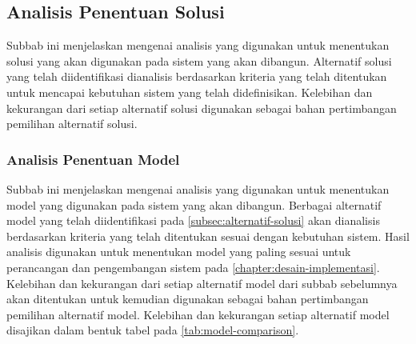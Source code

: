\subsection{Analisis Penentuan Solusi}
\label{subsec:analisis-penentuan-solusi}
Subbab ini menjelaskan mengenai analisis yang digunakan untuk menentukan solusi yang akan digunakan pada sistem yang akan dibangun. Alternatif solusi yang telah diidentifikasi dianalisis berdasarkan kriteria yang telah ditentukan untuk mencapai kebutuhan sistem yang telah didefinisikan. Kelebihan dan kekurangan dari setiap alternatif solusi digunakan sebagai bahan pertimbangan pemilihan alternatif solusi.
\subsubsection{Analisis Penentuan Model}
\label{subsubsec:analisis-penentuan-model}

Subbab ini menjelaskan mengenai analisis yang digunakan untuk menentukan model yang digunakan pada sistem yang akan dibangun. Berbagai alternatif model yang telah diidentifikasi pada \autoref{subsec:alternatif-solusi} akan dianalisis berdasarkan kriteria yang telah ditentukan sesuai dengan kebutuhan sistem. Hasil analisis digunakan untuk menentukan model yang paling sesuai untuk perancangan dan pengembangan sistem pada \autoref{chapter:desain-implementasi}. Kelebihan dan kekurangan dari setiap alternatif model dari subbab sebelumnya akan ditentukan untuk kemudian digunakan sebagai bahan pertimbangan pemilihan alternatif model. Kelebihan dan kekurangan setiap alternatif model disajikan dalam bentuk tabel pada \autoref{tab:model-comparison}.

